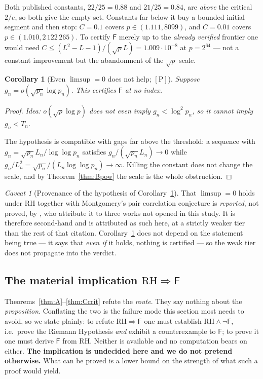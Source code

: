 \documentclass[11pt,a4paper]{article}
\theoremstyle{plain}
\newtheorem{corollary}[theorem]{Corollary}
\theoremstyle{definition}
\theoremstyle{remark}
\newtheorem{hazard}[theorem]{Caveat}
\newcommand{\idea}[1]{\emph{Idea: #1}\par\smallskip}
\newcommand{\cP}{{[\mathrm{P}]}}
\newcommand{\Fb}{\mathsf{F}}
\begin{document}
Both published constants, $22/25 = 0.88$ and $21/25 = 0.84$, are \emph{above} the critical
$2/e$, so both give the empty set. Constants far below it buy a bounded initial segment and
then stop: $C = 0.1$ covers $p \in (1.111, 8099)$, and $C = 0.01$ covers
$p \in (1.010, 2\,122\,265)$. To certify $\Fb$ merely up to the \emph{already verified}
frontier one would need $C \le (L^2 - L - 1)/(\sqrt{p}L) = 1.009\cdot10^{-8}$ at $p = 2^{64}$
--- not a constant improvement but the abandonment of the $\sqrt{p}$ scale.

\begin{corollary}[Even $\limsup = 0$ does not help; $\cP$]
\label{cor:limsup0}
Suppose $g_n = o(\sqrt{p_n}\log p_n)$. This certifies $\Fb$ at no index.
\end{corollary}

\begin{proof}
\idea{$o(\sqrt{p}\log p)$ does not even imply $g_n < \log^2 p_n$, so it cannot imply
$g_n < T_n$.}
The hypothesis is compatible with gaps far above the threshold: a sequence with
$g_n = \sqrt{p_n}L_n/\log\log p_n$ satisfies $g_n/(\sqrt{p_n}L_n) \to 0$ while
$g_n/L_n^2 = \sqrt{p_n}/(L_n \log\log p_n) \to \infty$. Killing the constant does not change
the scale, and by Theorem~\ref{thm:Bpow} the scale is the whole obstruction.
\end{proof}

\begin{hazard}[Provenance of the hypothesis of Corollary~\ref{cor:limsup0}]
That $\limsup = 0$ holds under RH together with Montgomery's pair correlation conjecture is
\emph{reported}, not proved, by \cite[\S1.2, after eq.~(1.14)]{carneiro2019fourier}, who
attribute it to three works not opened in this study. It is therefore second-hand and is
attributed as such here, at a strictly weaker tier than the rest of that citation.
Corollary~\ref{cor:limsup0} does not depend on the statement being true --- it says that
\emph{even if} it holds, nothing is certified --- so the weak tier does not propagate into the
verdict.
\end{hazard}

\subsection{The material implication $\mathrm{RH} \Rightarrow \Fb$}

Theorems~\ref{thm:A}--\ref{thm:Ccrit} refute the \emph{route}. They say nothing about the
\emph{proposition}. Conflating the two is the failure mode this section most needs to avoid,
so we state plainly: to refute $\mathrm{RH} \Rightarrow \Fb$ one must establish
$\mathrm{RH} \wedge \neg\Fb$, i.e.\ prove the Riemann Hypothesis \emph{and} exhibit a
counterexample to $\Fb$; to prove it one must derive $\Fb$ from RH. Neither is available and
no computation bears on either. \textbf{The implication is undecided here and we do not
pretend otherwise.} What can be proved is a lower bound on the strength of what such a proof
would yield.
\end{document}
